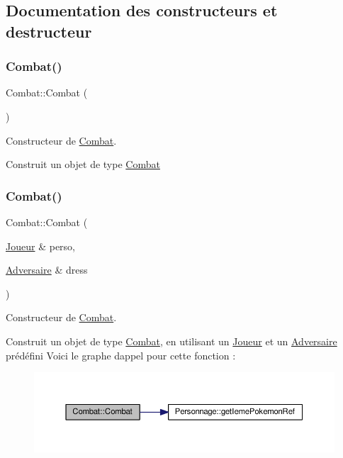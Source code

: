 \subsection{Documentation des constructeurs et destructeur}
\mbox{\label{class_combat_a4c2dfed2f9da749ae341de25c7427f73}} 
\subsubsection{\texorpdfstring{Combat()}{Combat()}\hspace{0.1cm}{\footnotesize\ttfamily [1/2]}}
{\footnotesize\ttfamily Combat\+::\+Combat (\begin{DoxyParamCaption}{ }\end{DoxyParamCaption})}



Constructeur de \hyperlink{class_combat}{Combat}. 

Construit un objet de type \hyperlink{class_combat}{Combat} \mbox{\label{class_combat_af420be03c806ef847c0542ab0d7223f9}} 
\subsubsection{\texorpdfstring{Combat()}{Combat()}\hspace{0.1cm}{\footnotesize\ttfamily [2/2]}}
{\footnotesize\ttfamily Combat\+::\+Combat (\begin{DoxyParamCaption}\item[{\hyperlink{class_joueur}{Joueur} \&}]{perso,  }\item[{\hyperlink{class_adversaire}{Adversaire} \&}]{dress }\end{DoxyParamCaption})}



Constructeur de \hyperlink{class_combat}{Combat}. 

Construit un objet de type \hyperlink{class_combat}{Combat}, en utilisant un \hyperlink{class_joueur}{Joueur} et un \hyperlink{class_adversaire}{Adversaire} prédéfini Voici le graphe d\textquotesingle{}appel pour cette fonction \+:\nopagebreak
\begin{figure}[H]
\begin{center}
\leavevmode
\includegraphics[width=350pt]{class_combat_af420be03c806ef847c0542ab0d7223f9_cgraph}
\end{center}
\end{figure}
\mbox{\label{class_combat_a044df77ec24b76ca8b1cc3dde0de5049}} 
